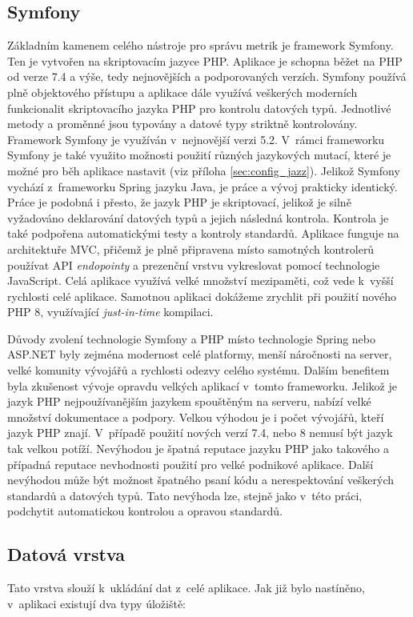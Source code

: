 \documentclass[czech,master]{diploma}
\begin{document}

\subsection{Symfony}
\label{sec:symfony}
Základním kamenem celého nástroje pro správu metrik je framework Symfony. Ten je vytvořen na skriptovacím jazyce PHP. Aplikace je schopna běžet na PHP od verze 7.4 a výše, tedy nejnovějších a podporovaných verzích. Symfony používá plně objektového přístupu a aplikace dále využívá veškerých moderních funkcionalit skriptovacího jazyka PHP pro kontrolu datových typů. Jednotlivé metody a proměnné jsou typovány a datové typy striktně kontrolovány. Framework Symfony je využíván v~nejnovější verzi 5.2. V~rámci frameworku Symfony je také využito možnosti použití různých jazykových mutací, které je možné pro běh aplikace nastavit (viz příloha \ref{sec:config_jazz}). Jelikož Symfony vychází z~frameworku Spring jazyku Java, je práce a vývoj prakticky identický. Práce je podobná i přesto, že jazyk PHP je skriptovací, jelikož je silně vyžadováno deklarování datových typů a jejich následná kontrola. Kontrola je také podpořena automatickými testy a kontroly standardů. Aplikace funguje na architektuře MVC, přičemž je plně připravena místo samotných kontrolerů používat API \textit{endopointy} a prezenční vrstvu vykreslovat pomocí technologie JavaScript. Celá aplikace využívá velké množství mezipaměti, což vede k~vyšší rychlosti celé aplikace. Samotnou aplikaci dokážeme zrychlit při použití nového PHP 8, využívající \textit{just-in-time} kompilaci.

Důvody zvolení technologie Symfony a PHP místo technologie Spring nebo ASP.NET byly zejména modernost celé platformy, menší náročnosti na server, velké komunity vývojářů a rychlosti odezvy celého systému. Dalším benefitem byla zkušenost vývoje opravdu velkých aplikací v~tomto frameworku. Jelikož je jazyk PHP nejpoužívanějším jazykem spouštěným na serveru, nabízí velké množství dokumentace a podpory. \cite{ref:php_trend} Velkou výhodou je i počet vývojářů, kteří jazyk PHP znají. V~případě použití nových verzí 7.4, nebo 8 nemusí být jazyk tak velkou potíží. Nevýhodou je špatná reputace jazyku PHP jako takového a případná reputace nevhodnosti použití pro velké podnikové aplikace. Další nevýhodou může být možnost špatného psaní kódu a nerespektování veškerých standardů a datových typů. Tato nevýhoda lze, stejně jako v~této práci, podchytit automatickou kontrolou a opravou standardů. 

\subsection{Datová vrstva}
Tato vrstva slouží k~ukládání dat z~celé aplikace. Jak již bylo nastíněno, v~aplikaci existují dva typy úložiště:
\end{document}
